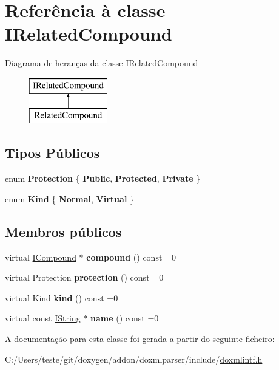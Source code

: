 \hypertarget{class_i_related_compound}{\section{Referência à classe I\-Related\-Compound}
\label{class_i_related_compound}
}
Diagrama de heranças da classe I\-Related\-Compound\begin{figure}[H]
\begin{center}
\leavevmode
\includegraphics[height=2.000000cm]{class_i_related_compound}
\end{center}
\end{figure}
\subsection*{Tipos Públicos}
\begin{DoxyCompactItemize}
\item 
enum {\bfseries Protection} \{ {\bfseries Public}, 
{\bfseries Protected}, 
{\bfseries Private}
 \}
\item 
enum {\bfseries Kind} \{ {\bfseries Normal}, 
{\bfseries Virtual}
 \}
\end{DoxyCompactItemize}
\subsection*{Membros públicos}
\begin{DoxyCompactItemize}
\item 
\hypertarget{class_i_related_compound_aa6da37037d5aeb4945ada6a9a8f4ce0e}{virtual \hyperlink{class_i_compound}{I\-Compound} $\ast$ {\bfseries compound} () const =0}\label{class_i_related_compound_aa6da37037d5aeb4945ada6a9a8f4ce0e}

\item 
\hypertarget{class_i_related_compound_a31e264b7491a497774b3c237ce4de628}{virtual Protection {\bfseries protection} () const =0}\label{class_i_related_compound_a31e264b7491a497774b3c237ce4de628}

\item 
\hypertarget{class_i_related_compound_a27e5d1dde6c9e861b52afa5a95f71d2d}{virtual Kind {\bfseries kind} () const =0}\label{class_i_related_compound_a27e5d1dde6c9e861b52afa5a95f71d2d}

\item 
\hypertarget{class_i_related_compound_af687440943d0a80c2b38cd5bb51b7a68}{virtual const \hyperlink{class_i_string}{I\-String} $\ast$ {\bfseries name} () const =0}\label{class_i_related_compound_af687440943d0a80c2b38cd5bb51b7a68}

\end{DoxyCompactItemize}


A documentação para esta classe foi gerada a partir do seguinte ficheiro\-:\begin{DoxyCompactItemize}
\item 
C\-:/\-Users/teste/git/doxygen/addon/doxmlparser/include/\hyperlink{include_2doxmlintf_8h}{doxmlintf.\-h}\end{DoxyCompactItemize}
